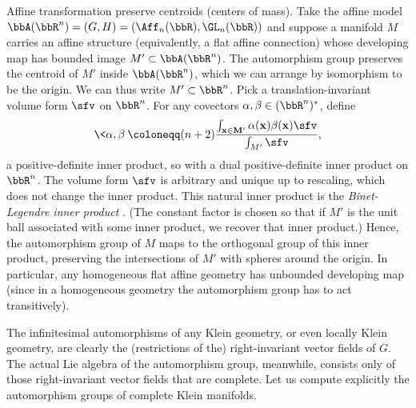\begin{example}
    Affine transformation preserve centroids (centers of mass). Take the affine model $\bbA(\bbR^n)=(G,H)=(\Aff_n(\bbR),\GL_n(\bbR))$ and suppose a manifold $M$ carries an affine structure (equivalently, a flat affine connection) whose developing map has bounded image $M'\subset\bbA(\bbR^n)$. The automorphism group preserves the centroid of $M'$ inside $\bbA(\bbR^n)$, which we can arrange by isomorphism to be the origin. We can thus write $M'\subset \bbR^n$. Pick a translation-invariant volume form $\sfv$ on $\bbR^n$. For any covectors $\alpha,\beta\in (\bbR^n)^\ast$, define 
    \[\<\alpha,\beta\>\coloneqq (n+2)\frac{\int_{\bf{x}\in M'}\alpha(\bf{x})\beta(\bf{x})\sfv}{\int_{M'}\sfv},\]
    a positive-definite inner product, so with a dual positive-definite inner product on $\bbR^n$. The volume form $\sfv$ is arbitrary and unique up to rescaling, which does not change the inner product. This natural inner product is the \emph{Binet-Legendre inner product} \cite{Matveev}.  (The constant factor is chosen so that if $M'$ is the unit ball associated with some inner product, we recover that inner product.) Hence, the automorphism group of $M$ maps to the orthogonal group of this inner product, preserving the intersections of $M'$ with spheres around the origin. In particular, any homogeneous flat affine geometry has unbounded developing map (since in a homogeneous geometry the automorphism group has to act transitively).
\end{example}


The infinitesimal automorphisms of any Klein geometry, or even locally Klein geometry, are clearly the (restrictions of the) right-invariant vector fields of $G$. The actual Lie algebra of the automorphism group, meanwhile, consists only of those right-invariant vector fields that are complete. Let us compute explicitly the automorphism groups of complete Klein manifolds.

